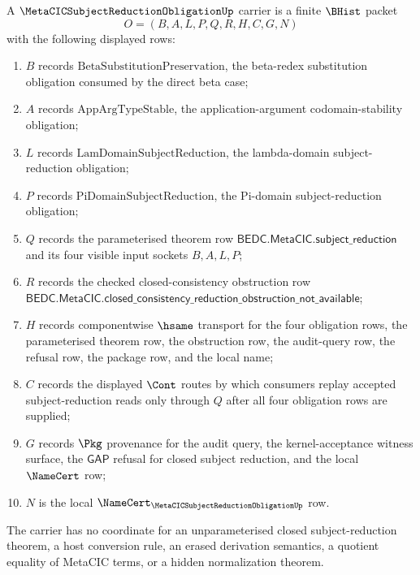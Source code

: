 \begin{definition}
\label{def:metacic-subject-reduction-obligation-carrier}
A $\MetaCICSubjectReductionObligationUp$ carrier is a finite $\BHist$ packet
$$
O=(B,A,L,P,Q,R,H,C,G,N)
$$
with the following displayed rows:
\begin{enumerate}
\item $B$ records $\mathrm{BetaSubstitutionPreservation}$, the beta-redex substitution obligation consumed by the direct beta case;
\item $A$ records $\mathrm{AppArgTypeStable}$, the application-argument codomain-stability obligation;
\item $L$ records $\mathrm{LamDomainSubjectReduction}$, the lambda-domain subject-reduction obligation;
\item $P$ records $\mathrm{PiDomainSubjectReduction}$, the Pi-domain subject-reduction obligation;
\item $Q$ records the parameterised theorem row $\mathsf{BEDC.MetaCIC.subject\_reduction}$ and its four visible input sockets $B,A,L,P$;
\item $R$ records the checked closed-consistency obstruction row $\mathsf{BEDC.MetaCIC.closed\_consistency\_reduction\_obstruction\_not\_available}$;
\item $H$ records componentwise $\hsame$ transport for the four obligation rows, the parameterised theorem row, the obstruction row, the audit-query row, the refusal row, the package row, and the local name;
\item $C$ records the displayed $\Cont$ routes by which consumers replay accepted subject-reduction reads only through $Q$ after all four obligation rows are supplied;
\item $G$ records $\Pkg$ provenance for the audit query, the kernel-acceptance witness surface, the $\mathsf{GAP}$ refusal for closed subject reduction, and the local $\NameCert$ row;
\item $N$ is the local $\NameCert_{\MetaCICSubjectReductionObligationUp}$ row.
\end{enumerate}
The carrier has no coordinate for an unparameterised closed subject-reduction theorem, a host conversion rule, an erased derivation semantics, a quotient equality of MetaCIC terms, or a hidden normalization theorem.
\end{definition}

